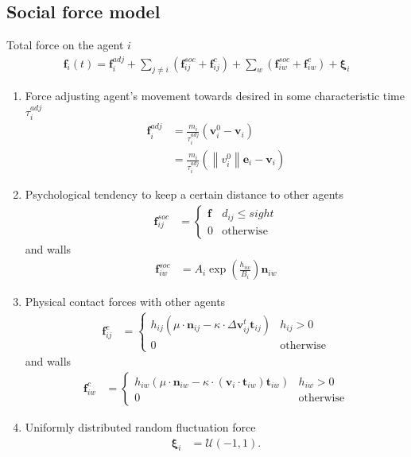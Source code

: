 \subsection{Social force model}
Total force on the agent $ i $
\begin{align}
\mathbf{f}_{i}(t) = \mathbf{f}_{i}^{adj} + \sum_{j\neq i}^{} \left(\mathbf{f}_{ij}^{soc} + \mathbf{f}_{ij}^{c}\right) + \sum_{w}^{} \left(\mathbf{f}_{iw}^{soc} + \mathbf{f}_{iw}^{c}\right) + \boldsymbol{\xi}_{i}
\end{align}

\begin{enumerate}[label=\roman{enumi})]
\item 
Force adjusting agent's movement towards desired in some characteristic time $ \tau_{i}^{adj} $
\begin{align}
\mathbf{f}_{i}^{adj} &= \frac{m_{i}}{\tau_{i}^{adj}} (\mathbf{v}_{i}^{0} - \mathbf{v}_{i}) \\
&=  \frac{m_{i}}{\tau_{i}^{adj}} (\left\|v_{i}^{0}\right\| \mathbf{e}_{i} - \mathbf{v}_{i})
\end{align}


\item 
Psychological tendency to keep a certain distance to other agents
\begin{align}
\mathbf{f}_{ij}^{soc} &=
\begin{cases}
\mathbf{f}_{} &  d_{ij} \leq sight \\
0 & \text{otherwise}
\end{cases}
\end{align}
and walls
\begin{align}
\mathbf{f}_{iw}^{soc} &= A_{i} \exp\left(\frac{h_{iw}}{B_{i}}\right) \mathbf{n}_{iw}
\end{align} 


\item 
Physical contact forces with other agents 
\begin{align}
\mathbf{f}_{ij}^{c} &= 
\begin{cases}
h_{ij} \left(\mu \cdot \mathbf{n}_{ij} - \kappa \cdot \Delta \mathbf{v}_{ij}^{t} \mathbf{t}_{ij}\right) & h_{ij} > 0 \\
0 & \text{otherwise}
\end{cases}
\end{align}
and walls
\begin{align}
\mathbf{f}_{iw}^{c} &= 
\begin{cases}
h_{iw} \left(\mu \cdot \mathbf{n}_{iw} - \kappa \cdot (\mathbf{v}_{i} \cdot \mathbf{t}_{iw}) \mathbf{t}_{iw}\right) & h_{iw} > 0 \\
0 & \text{otherwise}
\end{cases}
\end{align}


\item 
Uniformly distributed random fluctuation force
\begin{align}
\boldsymbol{\xi}_{i} &= \boldsymbol{\mathcal{U}}(-1, 1).
\end{align}


\end{enumerate}


